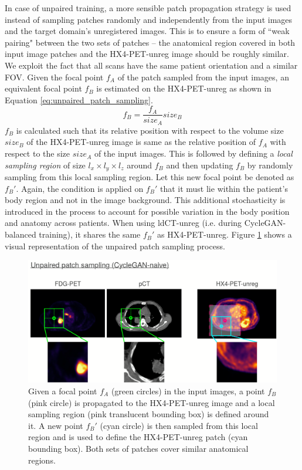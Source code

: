 In case of unpaired training, a more sensible patch propagation strategy is used instead of sampling patches randomly and independently from the input images and the target domain's unregistered images. This is to ensure a form of ``weak pairing" between the two sets of patches -- the anatomical region covered in both input image patches and the HX4-PET-unreg image should be roughly similar. We exploit the fact that all scans have the same patient orientation and a similar FOV. Given the focal point $f_A$ of the patch sampled from the input images, an equivalent focal point $f_B$ is estimated on the HX4-PET-unreg as shown in Equation \ref{eq:unpaired_patch_sampling}.
\begin{equation}
    f_B = \frac{f_A}{size_A} size_B
    \label{eq:unpaired_patch_sampling}
\end{equation}
$f_B$ is calculated such that its relative position with respect to the volume size $size_B$ of the HX4-PET-unreg image is same as the relative position of $f_A$ with respect to the size $size_A$ of the input images. This is followed by defining a \textit{local sampling region} of size $l_x \times l_y \times l_z$ around $f_B$ and then updating $f_B$ by randomly sampling from this local sampling region. Let this new focal point be denoted as $f_B'$. Again, the condition is applied on $f_B'$ that it must lie within the patient's body region and not in the image background. This additional stochasticity is introduced in the process to account for possible variation in the body position and anatomy across patients. When using ldCT-unreg (i.e. during CycleGAN-balanced training), it shares the same $f_B'$ as HX4-PET-unreg. Figure \ref{fig:unpaired_patch_sampling} shows a visual representation of the unpaired patch sampling process.

\begin{figure}[h!]
    \centering
    \includegraphics[width=\linewidth]{figures/Data/patch_sampling/unpaired_patch_sampling.png}
    \caption{Given a focal point $f_A$ (green circles) in the input images, a point $f_B$ (pink circle) is propagated to the HX4-PET-unreg image and a local sampling region (pink translucent bounding box) is defined around it. A new point $f_B'$ (cyan circle) is then sampled from this local region and is used to define the HX4-PET-unreg patch (cyan bounding box). Both sets of patches cover similar anatomical regions.}
    \label{fig:unpaired_patch_sampling}
\end{figure}

